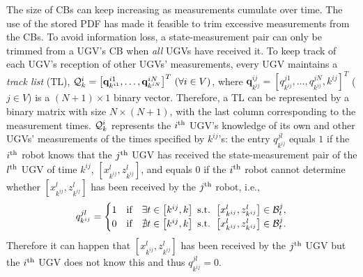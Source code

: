 	The size of CBs can keep increasing as measurements cumulate over time. 
	The use of the stored PDF has made it feasible to trim excessive measurements from the CBs.
	To avoid information loss, a state-measurement pair can only be trimmed from a UGV's CB when \textit{all} UGVs have received it.
	To keep track of each UGV's reception of other UGVs' measurements, every UGV maintains a \textit{track list} (TL), $\mathcal{Q}^i_k=\left[\mathbf{q}^{i1}_{k^{i1}},\dots, \mathbf{q}^{iN}_{k^{iN}}\right]^T \,(\forall i\in V)$, where $\mathbf{q}^{ij}_{k^{ij}}=\left[q^{j1}_{k^{ij}},\dots,q^{jN}_{k^{ij}},k^{ij}\right]^T$ ($j\in V$) is a $(N+1)\times 1$ binary vector.
	Therefore, a TL can be represented by a binary matrix with size $N\times (N+1)$, with the last column corresponding to the measurement times.
	$\mathcal{Q}^i_k$ represents the $i^\text{th}$ UGV's knowledge of its own and other UGVs' measurements of the times specified by $k^{ij}$'s: %
	the entry $q^{jl}_{k^{ij}}$ equals $1$ if the $i^\text{th}$ robot knows that the $j^\text{th}$ UGV has received the state-measurement pair of the $l^\text{th}$ UGV of time $k^{ij}$, $\left[x^l_{k^{ij}},z^l_{k^{ij}}\right]$, and equals $0$ if the $i^\text{th}$ robot cannot determine whether $\left[x^l_{k^{ij}},z^l_{k^{ij}}\right]$ has been received by the $j^\text{th}$ robot, i.e.,
	\small\begin{equation}\label{eqn:tl_entry}
	q^{jl}_{k^{ij}}=
	\begin{cases}
	1 & \text{if}\quad \exists t\in\left[k^{ij}, k\right] \text{ s.t. } \left[x^l_{k^{ij}},z^l_{k^{ij}}\right]\in \mathcal{B}^j_t,\\
	0 & \text{if}\quad \nexists t\in\left[k^{ij}, k\right] \text{ s.t. } \left[x^l_{k^{ij}},z^l_{k^{ij}}\right]\in \mathcal{B}^j_t.
	\end{cases}
	\end{equation}\normalsize
	Therefore it can happen that $\left[x^l_{k^{ij}},z^l_{k^{ij}}\right]$ has been received by the $j^\text{th}$ UGV but the $i^\text{th}$ UGV does not know this and thus $q^{jl}_{k^{ij}}=0$.
	
